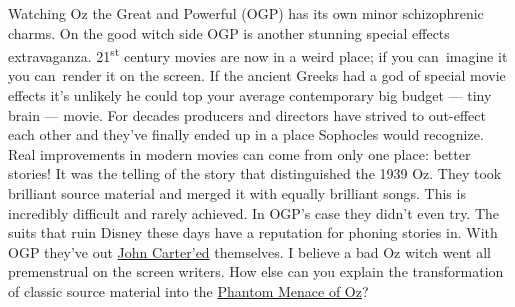 Watching Oz the Great and Powerful (OGP) has its own minor schizophrenic
charms. On the good witch side OGP is another stunning special effects
extravaganza. 21\textsuperscript{st} century movies are now in a weird
place; if you can~imagine it you can~render it on the screen. If the
ancient Greeks had a god of special movie effects it's unlikely he could
top your average contemporary big budget --- tiny brain --- movie. For
decades producers and directors have strived to out-effect each other
and they've finally ended up in a place Sophocles would recognize. Real
improvements in modern movies can come from only one place: better
stories! It was the telling of the story that distinguished the 1939 Oz.
They took brilliant source material and merged it with equally brilliant
songs. This is incredibly difficult and rarely achieved. In OGP's case
they didn't even try. The suits that ruin Disney these days have a
reputation for phoning stories in. With OGP they've out
\href{http://disney.go.com/johncarter/}{John Carter'ed} themselves. I
believe a bad Oz witch went all premenstrual on the screen writers. How
else can you explain the transformation of classic source material into
the
\href{http://www.news.com.au/entertainment/movies/in-case-you-thought-the-phantom-menace-didnt-suck-enough-heres-the-kids-trailer/story-e6frfmvr-1226261913906}{Phantom
Menace of Oz}?




%